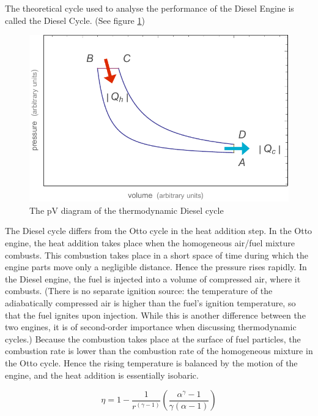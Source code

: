 The theoretical cycle used to analyse the performance of the Diesel Engine is
called the Diesel Cycle. (See figure \ref{fig:diesel-cycle})

\begin{figure}
\centering
\includegraphics[width=\textwidth]{Figures/diesel-cycle}
\decoRule
\caption[The Diesel cycle]{The pV diagram of the thermodynamic Diesel cycle}
\label{fig:diesel-cycle}
\end{figure}

The Diesel cycle differs from the Otto cycle in the heat addition step. In the
Otto engine, the heat addition takes place when the homogeneous air/fuel mixture
combusts. This combustion takes place in a short space of time during which
the engine parts move only a negligible distance. Hence the pressure rises
rapidly. In the Diesel engine, the fuel is injected into a volume of compressed
air, where it combusts. (There is no separate ignition source: the temperature
of the adiabatically compressed air is higher than the fuel's ignition
temperature, so that the fuel ignites upon injection. While this is another
difference between the two engines, it is of second-order importance when
discussing thermodynamic cycles.) Because the combustion takes place at the
surface of fuel particles, the combustion rate is lower than the combustion rate
of the homogeneous mixture in the Otto cycle. Hence the rising temperature is
balanced by the motion of the engine, and the heat addition is essentially
isobaric.

\begin{equation}
	\eta = 1 - \frac{1}{r^{(\gamma - 1 )}}(\frac{\alpha^{\gamma}-1}{\gamma(\alpha-1)})
\label{eqn:diesel-efficiency}
\end{equation}
 
